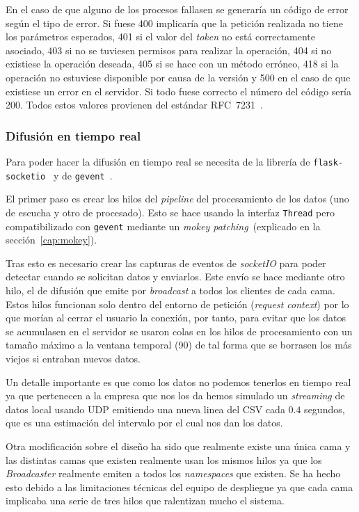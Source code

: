 En el caso de que alguno de los procesos fallasen se generaría un código de error según el tipo de error. Si fuese 400 implicaría que la petición realizada no tiene los parámetros esperados, 401 si el valor del \textit{token} no está correctamente asociado, 403 si no se tuviesen permisos para realizar la operación, 404 si no existiese la operación deseada, 405 si se hace con un método erróneo, 418 si la operación no estuviese disponible por causa de la versión y 500 en el caso de que existiese un error en el servidor. Si todo fuese correcto el número del código sería 200. Todos estos valores provienen del estándar RFC~7231~\cite{RFC7231}.

\subsubsection{Difusión en tiempo real}
Para poder hacer la difusión en tiempo real se necesita de la librería de \texttt{flask-socketio}~\cite{tool:flask-socketio} y de \texttt{gevent}~\cite{tool:gevent}. 

El primer paso es crear los hilos del \textit{pipeline} del procesamiento de los datos (uno de escucha y otro de procesado). Esto se hace usando la interfaz \texttt{Thread} pero compatibilizado con \texttt{gevent} mediante un \textit{mokey patching}~(explicado en la sección~\ref{cap:mokey}).

Tras esto es necesario crear las capturas de eventos de \textit{socketIO} para poder detectar cuando se solicitan datos y enviarlos. Este envío se hace mediante otro hilo, el de difusión que emite por \textit{broadcast} a todos los clientes de cada cama. Estos hilos funcionan solo dentro del entorno de petición (\textit{request context}) por lo que morían al cerrar el usuario la conexión, por tanto, para evitar que los datos se acumulasen en el servidor se usaron colas en los hilos de procesamiento con un tamaño máximo a la ventana temporal (90) de tal forma que se borrasen los más viejos si entraban nuevos datos.

Un detalle importante es que como los datos no podemos tenerlos en tiempo real ya que pertenecen a la empresa que nos los da hemos simulado un \textit{streaming} de datos local usando UDP emitiendo una nueva linea del CSV cada $0.4$ segundos, que es una estimación del intervalo por el cual nos dan los datos.

Otra modificación sobre el diseño ha sido que realmente existe una única cama y las distintas camas que existen realmente usan los mismos hilos ya que los \textit{Broadcaster} realmente emiten a todos los \textit{namespaces} que existen. Se ha hecho esto debido a las limitaciones técnicas del equipo de despliegue ya que cada cama implicaba una serie de tres hilos que ralentizan mucho el sistema.

